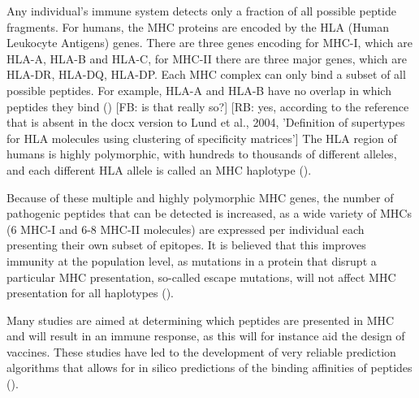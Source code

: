 
Any individual's immune system detects only a fraction of all possible
peptide fragments.
For humans, the MHC proteins are encoded by the
HLA (Human Leukocyte Antigens) genes.
There are three genes encoding for MHC-I, which are HLA-A, HLA-B and HLA-C,
for MHC-II there are three major genes, which are HLA-DR, HLA-DQ, HLA-DP.
Each MHC complex can only bind a subset of all possible peptides.
For example, HLA-A and HLA-B have no overlap in which
peptides they bind (\cite{lund2004definition})
[FB: is that really so?]
[RB: yes, according to the reference that is absent in the docx version to Lund et al., 2004, 'Definition of supertypes for {HLA} molecules using clustering of specificity matrices'] 
The HLA region of humans is highly polymorphic, with hundreds 
to thousands of different alleles, 
and each different HLA allele is called 
an MHC haplotype (\cite{marsh2010nomenclature}).


Because of these multiple and highly polymorphic MHC genes,
the number of pathogenic peptides that can be detected is increased,
as a wide variety of MHCs (6 MHC-I and 6-8 MHC-II molecules) 
are expressed per individual
each presenting their own subset of epitopes.
It is believed that this improves immunity at the population level, 
as mutations in a protein that disrupt a particular MHC presentation, 
so-called escape mutations, 
will not affect MHC presentation for all haplotypes (\cite{sommer2005importance}).


Many studies are aimed at determining which peptides are presented in MHC 
and will result in an immune response, 
as this will for instance aid the design of vaccines. 
These studies have led to the development 
of very reliable prediction algorithms 
that allows for in silico predictions 
of the binding affinities of peptides (\cite{larsen2010identification,schellens2008unanticipated,tang2011genome}).
 
